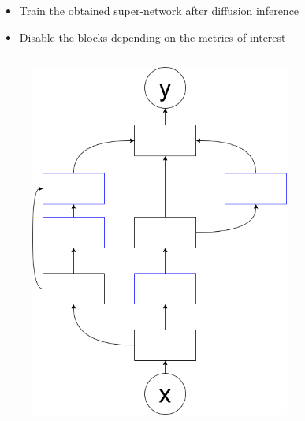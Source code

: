 \documentclass[aspectratio=169,xcolor=dvipsnames]{beamer}
\begin{document}
\begin{frame}
    \begin{itemize}
        \item Train the obtained super-network after diffusion inference
        \item Disable the blocks depending on the metrics of interest
    \end{itemize}
    \begin{columns}[c]
        \begin{figure}[htbp]
            \centering
            \includegraphics[width=.8\textwidth]{diagram.drawio.png}
        \end{figure}
        \begin{figure}[htbp]
            \centering

\end{figure}
\end{columns}
\end{frame}
\end{document}
